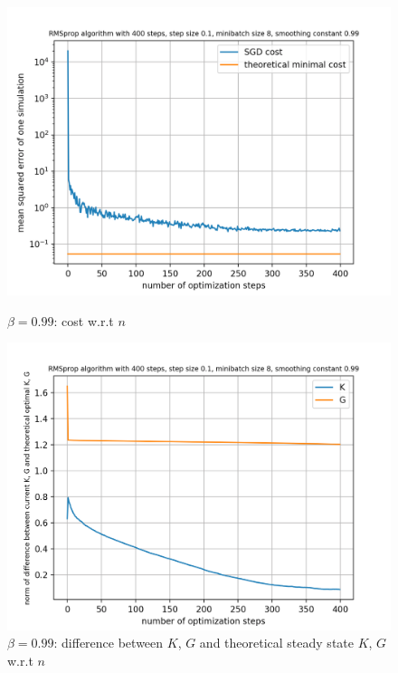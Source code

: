 \documentclass{article}
\begin{document}
\begin{figure}[h!]
	\centering
	\begin{minipage}[t]{.28\paperwidth}
		\centering
		\includegraphics[width=1.0\textwidth]{Figures/beta_0_99.png}
		\caption{$\beta = 0.99$: cost w.r.t $n$\label{fig:beta_0_99}}
	\end{minipage}%
	\begin{minipage}[t]{.28\paperwidth}
		\centering
		\includegraphics[width=1.0\textwidth]{Figures/d_beta_0_99.png}
		\caption{$\beta = 0.99$: difference between $K$, $G$ and theoretical steady state $K$, $G$ w.r.t $n$}
	\end{minipage}%
	\begin{minipage}[t]{.28\paperwidth}

\end{minipage}
\end{figure}
\end{document}

